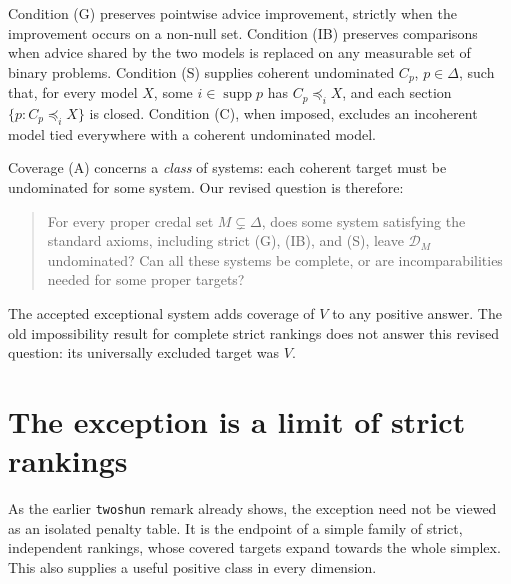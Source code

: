 \documentclass[11pt]{article}
\theoremstyle{remark}\newtheorem{remark}[theorem]{Remark}
\newcommand{\Dscr}{\mathcal D}
\newcommand{\supp}{\operatorname{supp}}
\begin{document}
Condition (G) preserves pointwise advice improvement, strictly when the
improvement occurs on a non-null set. Condition (IB) preserves comparisons
when advice shared by the two models is replaced on any measurable set
of binary problems. Condition (S) supplies coherent undominated $C_p$,
$p\in\Delta$, such that, for every model $X$, some $i\in\supp p$ has
$C_p\preceq_iX$, and each section $\{p:C_p\preceq_iX\}$ is closed.
Condition (C), when imposed, excludes an incoherent model tied everywhere
with a coherent undominated model.

Coverage (A) concerns a \emph{class} of systems: each coherent target must
be undominated for some system. Our revised question is therefore:
\begin{quote}
For every proper credal set $M\subsetneq\Delta$, does some system satisfying
the standard axioms, including strict (G), (IB), and (S), leave $\Dscr_M$
undominated? Can all these systems be complete, or are incomparabilities
needed for some proper targets?
\end{quote}
The accepted exceptional system adds coverage of $V$ to any positive answer.
The old impossibility result for complete strict rankings does not answer
this revised question: its universally excluded target was $V$.

\section{The exception is a limit of strict rankings}

As the earlier \texttt{twoshun} remark already shows, the exception need
not be viewed as an isolated penalty table. It is the
endpoint of a simple family of strict, independent rankings, whose covered
targets expand towards the whole simplex. This also supplies a useful
positive class in every dimension.
\end{document}
